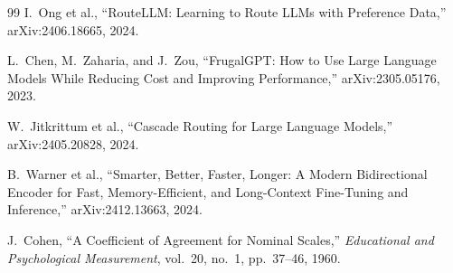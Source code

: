 \documentclass[twocolumn,10pt,a4paper]{article}
\begin{document}
\begin{thebibliography}{99}
I.~Ong et al., ``RouteLLM: Learning to Route LLMs with Preference Data,''
arXiv:2406.18665, 2024.

L.~Chen, M.~Zaharia, and J.~Zou, ``FrugalGPT: How to Use Large Language Models While Reducing Cost and Improving Performance,''
arXiv:2305.05176, 2023.

W.~Jitkrittum et al., ``Cascade Routing for Large Language Models,''
arXiv:2405.20828, 2024.

B.~Warner et al., ``Smarter, Better, Faster, Longer: A Modern Bidirectional Encoder for Fast, Memory-Efficient, and Long-Context Fine-Tuning and Inference,''
arXiv:2412.13663, 2024.

J.~Cohen, ``A Coefficient of Agreement for Nominal Scales,''
\emph{Educational and Psychological Measurement}, vol.~20, no.~1, pp.~37--46, 1960.

\end{thebibliography}
\endgroup
\end{document}

